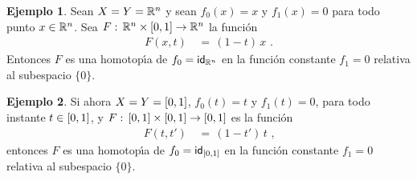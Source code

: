 \theoremstyle{definition}
\newtheorem{ejemploIdentidadDeEspacioEuclideo}{Ejemplo}[section]
\newtheorem{ejemploIdentidadDelIntervalo}[ejemploIdentidadDeEspacioEuclideo]%
	{Ejemplo}
\newtheorem{ejemploReflexionEnElDisco}[ejemploIdentidadDeEspacioEuclideo]%
	{Ejemplo}
\newtheorem{ejemploHomotopiaLinealEnUnConvexo}%
	[ejemploIdentidadDeEspacioEuclideo]{Ejemplo}
\newtheorem{ejemploElPeine}[ejemploIdentidadDeEspacioEuclideo]{Ejemplo}
\newtheorem{ejemploElPeineYElCuadrado}[ejemploIdentidadDeEspacioEuclideo]%
	{Ejemplo}
\newtheorem{ejemploPuntoDeformacionFuerteDeConvexos}%
	[ejemploIdentidadDeEspacioEuclideo]{Ejemplo}
\newtheorem{ejemploEsferaDeformacionFuerteDelEspacioSinUnPunto}%
	[ejemploIdentidadDeEspacioEuclideo]{Ejemplo}
\newtheorem{ejemploElPeineYElCuadradoNoEsRetracto}%
	[ejemploIdentidadDeEspacioEuclideo]{Ejemplo}
\newtheorem{ejemploElPuntoYElPeine}%
	[ejemploIdentidadDeEspacioEuclideo]{Ejemplo}


\begin{ejemploIdentidadDeEspacioEuclideo}%
	\label{ejemplo:identidaddeespacioeuclideo}
	Sean $X=Y=\bb{R}^{n}$ y sean $f_{0}(x)=x$ y $f_{1}(x)=0$ para todo
	punto $x\in\bb{R}^{n}$. Sea
	$F:\,\bb{R}^{n}\times\intervalo\rightarrow\bb{R}^{n}$ la funci\'{o}n
	\begin{align*}
		F(x,t) & \,=\,(1-t)\,x
		\text{ .}
	\end{align*}
	Entonces $F$ es una homotop\'{\i}a de $f_{0}=\id[\bb{R}^{n}]$ en la
	funci\'{o}n constante $f_{1}=0$ relativa al subespacio $\{0\}$.
\end{ejemploIdentidadDeEspacioEuclideo}

\begin{ejemploIdentidadDelIntervalo}\label{ejemplo:identidaddelintervalo}
	Si ahora $X=Y=\intervalo$, $f_{0}(t)=t$ y $f_{1}(t)=0$, para todo
	instante $t\in\intervalo$, y
	$F:\,\intervalo\times\intervalo\rightarrow\intervalo$ es la funci\'{o}n
	\begin{align*}
		F(t,t') & \,=\,(1-t')\,t
		\text{ ,}
	\end{align*}
	entonces $F$ es una homotop\'{\i}a de $f_{0}=\id[\intervalo]$ en
	la funci\'{o}n constante $f_{1}=0$ relativa al subespacio $\{0\}$.
\end{ejemploIdentidadDelIntervalo}


